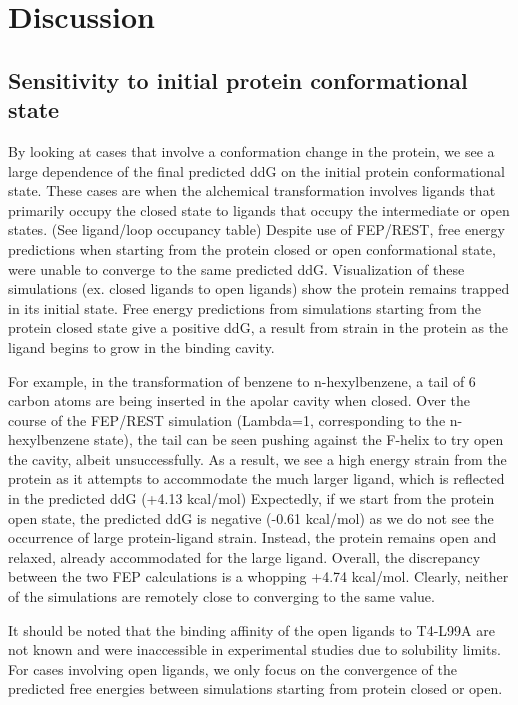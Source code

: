 \documentclass{article}
\begin{document}
\section{Discussion}
\subsection{Sensitivity to initial protein conformational state}
By looking at cases that involve a conformation change in the protein, we see a large dependence of the final predicted ddG on the initial protein conformational state.
These cases are when the alchemical transformation involves ligands that primarily occupy the closed state to ligands that occupy the intermediate or open states. (See ligand/loop occupancy table)
Despite use of FEP/REST, free energy predictions when starting from the protein closed or open conformational state, were unable to converge to the same predicted ddG.
Visualization of these simulations (ex. closed ligands to open ligands) show the protein remains trapped in its initial state.
Free energy predictions from simulations starting from the protein closed state give a positive ddG, a result from strain in the protein as the ligand begins to grow in the binding cavity.

For example, in the transformation of benzene to n-hexylbenzene, a tail of 6 carbon atoms are being inserted in the apolar cavity when closed.
Over the course of the FEP/REST simulation (Lambda=1, corresponding to the n-hexylbenzene state), the tail can be seen pushing against the F-helix to try open the cavity, albeit unsuccessfully.
As a result, we see a high energy strain from the protein as it attempts to accommodate the much larger ligand, which is reflected in the predicted ddG (+4.13 kcal/mol)
Expectedly, if we start from the protein open state, the predicted ddG is negative (-0.61 kcal/mol) as we do not see the occurrence of large protein-ligand strain.
Instead, the protein remains open and relaxed, already accommodated for the large ligand.
Overall, the discrepancy between the two FEP calculations is a whopping +4.74 kcal/mol.
Clearly, neither of the simulations are remotely close to converging to the same value. 

It should be noted that the binding affinity of the open ligands to T4-L99A are not known and were inaccessible in experimental studies due to solubility limits. \cite{Merski2015}
For cases involving open ligands, we only focus on the convergence of the predicted free energies between simulations starting from protein closed or open.
\end{document}
